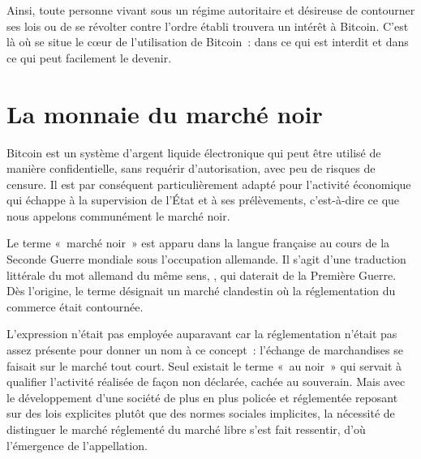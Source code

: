 Ainsi, toute personne vivant sous un régime autoritaire et désireuse de contourner ses lois ou de se révolter contre l'ordre établi trouvera un intérêt à Bitcoin. C'est là où se situe le cœur de l'utilisation de Bitcoin~: dans ce qui est interdit et dans ce qui peut facilement le devenir.


\section*{La monnaie du marché noir}

Bitcoin est un système d'argent liquide électronique qui peut être utilisé de manière confidentielle, sans requérir d'autorisation, avec peu de risques de censure. Il est par conséquent particulièrement adapté pour l'activité économique qui échappe à la supervision de l'État et à ses prélèvements, c'est-à-dire ce que nous appelons communément le marché noir.


Le terme «~marché noir~» est apparu dans la langue française au cours de la Seconde Guerre mondiale sous l'occupation allemande. Il s'agit d'une traduction littérale du mot allemand du même sens, , qui daterait de la Première Guerre. Dès l'origine, le terme désignait un marché clandestin où la réglementation du commerce était contournée.

L'expression n'était pas employée auparavant car la réglementation n'était pas assez présente pour donner un nom à ce concept~: l'échange de marchandises se faisait sur le marché tout court. Seul existait le terme «~au noir~» qui servait à qualifier l'activité réalisée de façon non déclarée, cachée au souverain. Mais avec le développement d'une société de plus en plus policée et réglementée reposant sur des lois explicites plutôt que des normes sociales implicites, la nécessité de distinguer le marché réglementé du marché libre s'est fait ressentir, d'où l'émergence de l'appellation.

